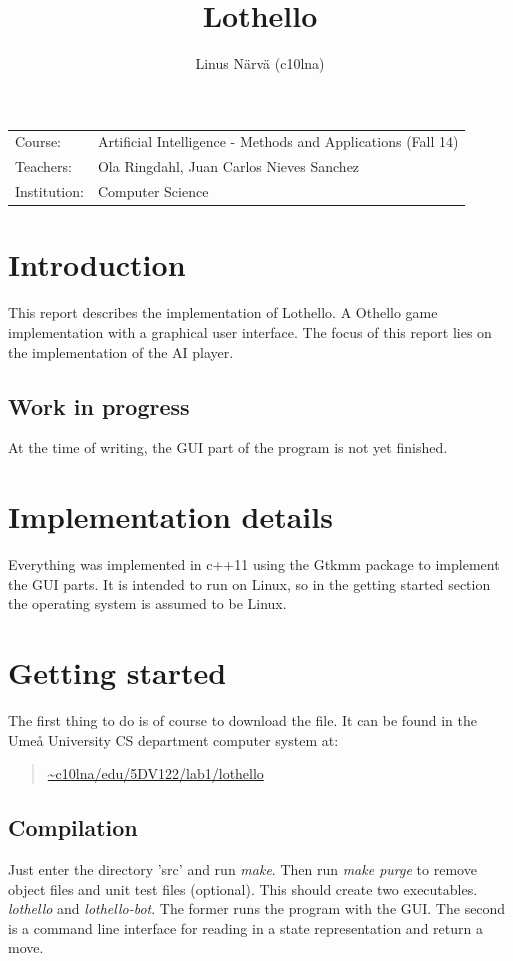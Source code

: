 \documentclass[a4paper,11pt]{article}
\title{Lothello}
\author{Linus Närvä (c10lna)}
\begin{document}
\maketitle

\begin{tabular}{l l}
Course: & Artificial Intelligence - Methods and Applications (Fall 14) \\
Teachers: & Ola Ringdahl, Juan Carlos Nieves Sanchez \\
Institution: & Computer Science \\
\end{tabular}

\section{Introduction}
This report describes the implementation of Lothello. A Othello game implementation with a graphical user interface. The focus of this report lies on the implementation of the AI player.

\subsection{Work in progress}
At the time of writing, the GUI part of the program is not yet finished.

\section{Implementation details}
Everything was implemented in c++11 using the Gtkmm package to implement the GUI parts. It is intended to run on Linux, so in the getting started section the operating system is assumed to be Linux.

\section{Getting started}
The first thing to do is of course to download the file. It can be found in the Umeå University CS department computer system at:
\begin{quotation}
\url{~c10lna/edu/5DV122/lab1/lothello}
\end{quotation}

\subsection{Compilation}
Just enter the directory 'src' and run \textit{make}. Then run \textit{make purge} to remove object files and unit test files (optional). This should create two executables. \textit{lothello} and \textit{lothello-bot}. The former runs the program with the GUI. The second is a command line interface for reading in a state representation and return a move.
\end{document}
